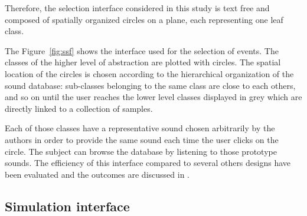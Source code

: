 \documentclass[12pt]{elsarticle}
\begin{document}

Therefore, the selection interface considered in this study is text free and composed of spatially organized circles on a plane, each representing one leaf class.


The Figure~\ref{fig:ssf} shows the interface used for the selection of events. The classes of the higher level of abstraction are plotted with circles. The spatial location of the circles is chosen according to the hierarchical organization of the sound database: sub-classes belonging to the same class are close to each others, and so on until the user reaches the lower level classes displayed in grey which are directly linked to a collection of samples.


Each of those classes have a representative sound chosen arbitrarily by the authors in order to provide the same sound each time the user clicks on the circle. The subject can browse the database by listening to those prototype sounds. The efficiency of this interface compared to several others designs have been evaluated and the outcomes are discussed in \cite{lafay2016JAES}.

\subsection{Simulation interface}
\end{document}
